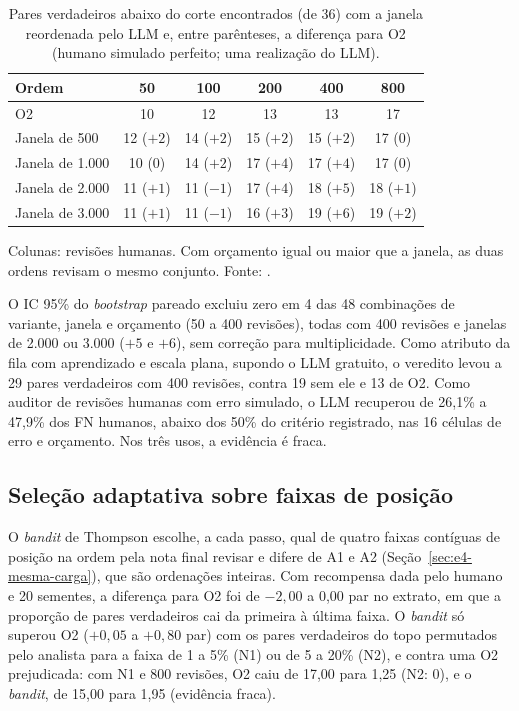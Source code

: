 \begin{table}[!ht]
\centering
\footnotesize
\caption{Pares verdadeiros abaixo do corte encontrados (de 36) com a janela reordenada pelo LLM e, entre parênteses, a diferença para O2 (humano simulado perfeito; uma realização do LLM).}
\label{tab:ap-desempate}
\begin{tabular}{lccccc}
\toprule
Ordem & 50 & 100 & 200 & 400 & 800 \\
\midrule
O2 & 10 & 12 & 13 & 13 & 17 \\
Janela de 500 & 12 ($+2$) & 14 ($+2$) & 15 ($+2$) & 15 ($+2$) & 17 (0) \\
Janela de 1.000 & 10 (0) & 14 ($+2$) & 17 ($+4$) & 17 ($+4$) & 17 (0) \\
Janela de 2.000 & 11 ($+1$) & 11 ($-1$) & 17 ($+4$) & 18 ($+5$) & 18 ($+1$) \\
Janela de 3.000 & 11 ($+1$) & 11 ($-1$) & 16 ($+3$) & 19 ($+6$) & 19 ($+2$) \\
\bottomrule
\end{tabular}
\par\smallskip
\parbox{\linewidth}{\footnotesize Colunas: revisões humanas. Com orçamento igual ou maior que a janela, as duas ordens revisam o mesmo conjunto. Fonte: .}
\end{table}

O IC 95\% do \textit{bootstrap} pareado excluiu zero em 4 das 48 combinações de variante, janela e orçamento (50 a 400 revisões), todas com 400 revisões e janelas de 2.000 ou 3.000 ($+5$ e $+6$), sem correção para multiplicidade. Como atributo da fila com aprendizado e escala plana, supondo o LLM gratuito, o veredito levou a 29 pares verdadeiros com 400 revisões, contra 19 sem ele e 13 de O2. Como auditor de revisões humanas com erro simulado, o LLM recuperou de 26,1\% a 47,9\% dos FN humanos, abaixo dos 50\% do critério registrado, nas 16 células de erro e orçamento. Nos três usos, a evidência é fraca.

\subsection{Seleção adaptativa sobre faixas de posição}\label{sec:e4-ap-bandit}

O \textit{bandit} de Thompson escolhe, a cada passo, qual de quatro faixas contíguas de posição na ordem pela nota final revisar e difere de A1 e A2 (Seção~\ref{sec:e4-mesma-carga}), que são ordenações inteiras. Com recompensa dada pelo humano e 20 sementes, a diferença para O2 foi de $-2{,}00$ a 0,00 par no extrato, em que a proporção de pares verdadeiros cai da primeira à última faixa. O \textit{bandit} só superou O2 ($+0{,}05$ a $+0{,}80$ par) com os pares verdadeiros do topo permutados pelo analista para a faixa de 1 a 5\% (N1) ou de 5 a 20\% (N2), e contra uma O2 prejudicada: com N1 e 800 revisões, O2 caiu de 17,00 para 1,25 (N2: 0), e o \textit{bandit}, de 15,00 para 1,95 (evidência fraca).

